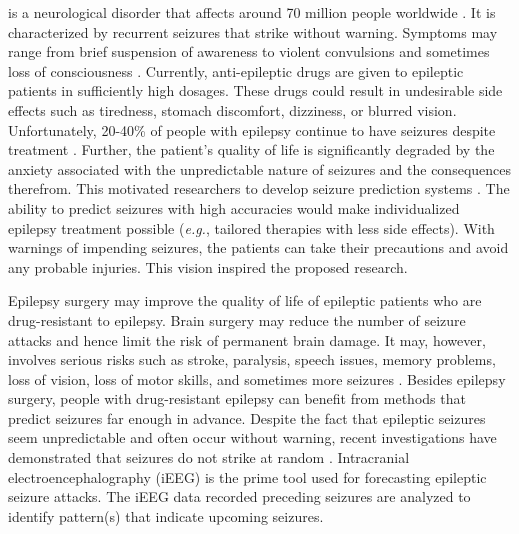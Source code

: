 \documentclass[journal]{IEEEtran}
\begin{document}
 is a neurological disorder that affects around 70 million people worldwide \cite{Epilepsy}. It is characterized by recurrent seizures that strike without warning. Symptoms may range from brief suspension of awareness to violent convulsions and sometimes loss of consciousness \cite{Symptoms}. Currently, anti-epileptic drugs are given to epileptic patients in sufficiently high dosages. These drugs could result in undesirable side effects such as tiredness, stomach discomfort, dizziness, or blurred vision. Unfortunately, 20-40\% of people with epilepsy continue to have seizures despite treatment \cite{french2007refractory}. Further, the patient’s quality of life is significantly degraded by the anxiety associated with the unpredictable nature of seizures and the consequences therefrom. This motivated researchers to develop seizure prediction systems \cite{d2003epileptic}. The ability to predict seizures with high accuracies would make individualized epilepsy treatment possible (\textit{e.g.}, tailored therapies with less side effects). With warnings of impending seizures, the patients can take their precautions and avoid any probable injuries. This vision inspired the proposed research.



Epilepsy surgery may improve the quality of life of epileptic patients who are drug-resistant to epilepsy. Brain surgery may reduce the number of seizure attacks and hence limit the risk of permanent brain damage. It may, however, involves serious risks such as stroke, paralysis, speech issues, memory problems, loss of vision, loss of motor skills, and sometimes more seizures \cite{tellez2010surgical}. Besides epilepsy surgery, people with drug-resistant epilepsy can benefit from methods that predict seizures far enough in advance. Despite the fact that epileptic seizures seem unpredictable and often occur without warning, recent investigations have demonstrated that seizures do not strike at random \cite{gadhoumi2016seizure, assi2017towards}. Intracranial electroencephalography (iEEG) is the prime tool used for forecasting epileptic seizure attacks. The iEEG data recorded preceding seizures are analyzed to identify pattern(s) that indicate upcoming seizures.
\end{document}
